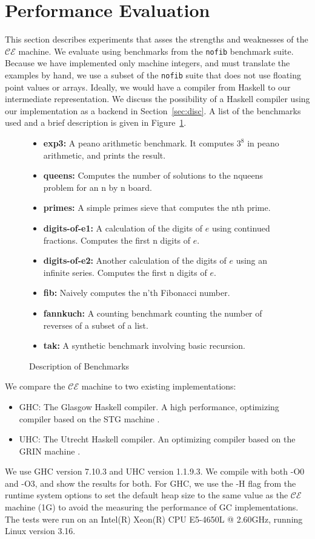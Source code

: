 \section{Performance Evaluation} \label{sec:eval}

This section describes experiments that asses the strengths and weaknesses of
the $\mathcal{CE}$ machine. We evaluate using benchmarks from the \texttt{nofib}
benchmark suite. Because we have implemented only machine integers, and must
translate the examples by hand, we use a subset of the \texttt{nofib} suite that
does not use floating point values or arrays. Ideally, we would have a compiler
from Haskell to our intermediate representation. We discuss the possibility of a
Haskell compiler using our implementation as a backend in
Section~\ref{sec:disc}. A list of the benchmarks used and a brief description is
given in Figure~\ref{fig:bench}.

\begin{figure}
\begin{itemize}
\item \textbf{exp3:} A peano arithmetic benchmark. It computes $3^8$ in
peano arithmetic, and prints the result. 
\item \textbf{queens:} Computes the number of solutions to the nqueens problem
for an n by n board.
\item \textbf{primes:} A simple primes sieve that computes the nth prime.
\item \textbf{digits-of-e1:} A calculation of the digits of $e$ using continued
fractions. Computes the first n digits of $e$.
\item \textbf{digits-of-e2:} Another calculation of the digits of $e$ using an
infinite series. Computes the first n digits of $e$. 
\item \textbf{fib:} Naively computes the n'th Fibonacci number.
\item \textbf{fannkuch:} A counting benchmark counting the number of reverses of
a subset of a list.
\item \textbf{tak:} A synthetic benchmark involving basic recursion.
\end{itemize}
\caption{Description of Benchmarks}
\label{fig:bench}
\end{figure}

We compare the $\mathcal{CE}$ machine to two existing implementations:

\begin{itemize}
\item GHC: The Glasgow Haskell compiler. A high performance, optimizing compiler
based on the STG machine \cite{jonesstg}.
\item UHC: The Utrecht Haskell compiler. An optimizing compiler based on the
GRIN machine \cite{boquist1997grin,dijkstra2009architecture}.
\end{itemize}

We use GHC version 7.10.3 and UHC version 1.1.9.3. We compile with both -O0 and
-O3, and show the results for both. For GHC, we use the -H flag from the runtime
system options to set the default heap size to the same value as the
$\mathcal{CE}$ machine (1G) to avoid the measuring the performance of GC
implementations. The tests were run on an Intel(R) Xeon(R) CPU E5-4650L @
2.60GHz, running Linux version 3.16. 
